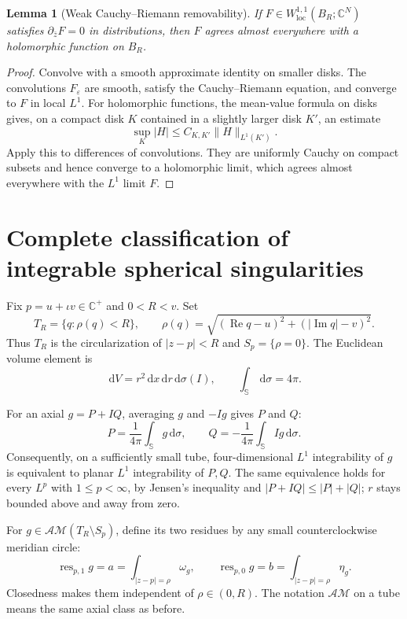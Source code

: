 \documentclass[11pt,a4paper]{article}
\numberwithin{equation}{section}
\newtheorem{lemma}[theorem]{Lemma}
\theoremstyle{definition}
\theoremstyle{remark}
\newcommand{\C}{\mathbb C}
\newcommand{\SSS}{\mathbb S}
\newcommand{\ic}{\iota}
\newcommand{\AM}{\mathcal{AM}}
\newcommand{\Rea}{\operatorname{Re}}
\newcommand{\Ima}{\operatorname{Im}}
\newcommand{\dd}{\,\mathrm d}
\newcommand{\norm}[1]{\lVert #1\rVert}
\begin{document}
\begin{lemma}[Weak Cauchy--Riemann removability]\label{lem:weakCR}
If $F\in W^{1,1}_{\mathrm{loc}}(B_R;\C^N)$ satisfies
$\partial_{\bar z}F=0$ in distributions, then $F$ agrees almost everywhere
with a holomorphic function on $B_R$.
\end{lemma}
\begin{proof}
Convolve with a smooth approximate identity on smaller disks. The
convolutions $F_\varepsilon$ are smooth, satisfy the Cauchy--Riemann equation,
and converge to $F$ in local $L^1$. For holomorphic functions, the mean-value
formula on disks gives, on a compact disk $K$ contained in a slightly larger
disk $K'$, an estimate
\[
 \sup_K|H|\le C_{K,K'}\norm{H}_{L^1(K')}.
\]
Apply this to differences of convolutions. They are uniformly Cauchy on
compact subsets and hence converge to a holomorphic limit, which agrees
almost everywhere with the $L^1$ limit $F$.
\end{proof}

\section{Complete classification of integrable spherical singularities}
\label{sec:singularities}

Fix $p=u+\ic v\in\C^+$ and $0<R<v$. Set
\begin{equation}
 T_R=\{q:\rho(q)<R\},\qquad
 \rho(q)=\sqrt{(\Rea q-u)^2+(|\Ima q|-v)^2}.
 \label{eq:tube}
\end{equation}
Thus $T_R$ is the circularization of $|z-p|<R$ and $S_p=\{\rho=0\}$.
The Euclidean volume element is
\begin{equation}
 \dd V=r^2\dd x\dd r\dd\sigma(I),\qquad
 \int_{\SSS}\dd\sigma=4\pi.
 \label{eq:volume}
\end{equation}

For an axial $g=P+I Q$, averaging $g$ and $-Ig$ gives $P$ and $Q$:
\[
 P=\frac1{4\pi}\int_{\SSS}g\dd\sigma,
 \qquad Q=-\frac1{4\pi}\int_{\SSS}I g\dd\sigma.
\]
Consequently, on a sufficiently small tube, four-dimensional $L^1$
integrability of $g$ is equivalent to planar $L^1$ integrability of $P,Q$.
The same equivalence holds for every $L^p$ with $1\le p<\infty$, by Jensen's
inequality and $|P+I Q|\le|P|+|Q|$; $r$ stays bounded above and away from zero.

For $g\in\AM(T_R\setminus S_p)$, define its two residues by any small
counterclockwise meridian circle:
\begin{equation}
 \operatorname{res}_{p,1}g=a=\int_{|z-p|=\rho}\omega_g,
 \qquad
 \operatorname{res}_{p,0}g=b=\int_{|z-p|=\rho}\eta_g.
 \label{eq:residues}
\end{equation}
Closedness makes them independent of $\rho\in(0,R)$.
The notation $\AM$ on a tube means the same axial class as before.
\end{document}
